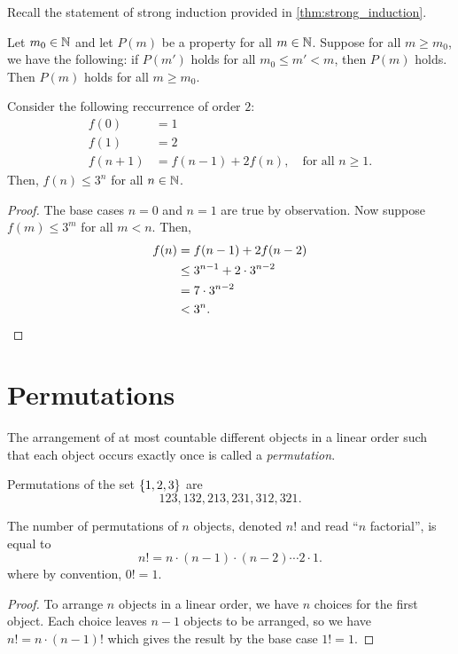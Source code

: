 Recall the statement of strong induction provided in
\cref{thm:strong_induction}.
\begin{theorem*}
    Let $m_0 \in \mathbb{N}$ and let $P(m)$ be a property for all $m \in \mathbb{N}$.
    Suppose for all $m \ge m_0$, we have the following:
    if $P(m')$ holds for all $m_0 \le m' < m$, then $P(m)$ holds.
    Then $P(m)$ holds for all $m \ge m_0$.
\end{theorem*}
\begin{example}
    Consider the following reccurrence of order $2$: \begin{align*}
        f(0) &= 1 \\
        f(1) &= 2 \\
        f(n+1) &= f(n-1) + 2f(n), \quad \text{for all } n \ge 1.
    \end{align*}
    Then, $f(n) \le 3^n$ for all $n \in \mathbb{N}$.
    \begin{proof}
        The base cases $n = 0$ and $n = 1$ are true by observation.
        Now suppose $f(m) \le 3^m$ for all $m < n$.
        Then, \begin{align*}
            f(n) &= f(n-1) + 2f(n-2) \\
            &\le 3^{n-1} + 2 \cdot 3^{n-2} \\
            &= 7 \cdot 3^{n-2} \\
            &< 3^n. \qedhere
        \end{align*}
    \end{proof}
\end{example}

\section{Permutations} \label{sec:permutations}
\begin{definition*}[Permutation] \label{def:permutation}
    The arrangement of at most countable different objects in a linear order
    such that each object occurs exactly once is called a \emph{permutation}.
\end{definition*}
\begin{example}
    Permutations of the set $\set{1, 2, 3}$ are \[
        123, 132, 213, 231, 312, 321.
    \]
\end{example}

\begin{proposition}
    The number of permutations of $n$ objects, denoted $n!$ and read
    ``$n$ factorial'', is equal to \[
        n! = n \cdot (n-1) \cdot (n-2) \cdots 2 \cdot 1.
    \] where by convention, $0! = 1$.
\end{proposition}
\begin{proof}
    To arrange $n$ objects in a linear order, we have $n$ choices for the
    first object.
    Each choice leaves $n-1$ objects to be arranged, so we have
    $n! = n \cdot (n-1)!$ which gives the result by the base case $1! = 1$.
\end{proof}

